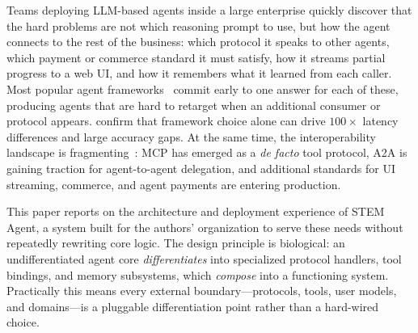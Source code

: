 \documentclass[11pt]{article}
\begin{document}
Teams deploying LLM-based agents inside a large enterprise quickly discover that the hard problems are not which reasoning prompt to use, but how the agent connects to the rest of the business: which protocol it speaks to other agents, which payment or commerce standard it must satisfy, how it streams partial progress to a web UI, and how it remembers what it learned from each caller. Most popular agent frameworks~\citep{tran2025multiagent, ferrag2025agents} commit early to one answer for each of these, producing agents that are hard to retarget when an additional consumer or protocol appears. \citet{orogat2026mafbench} confirm that framework choice alone can drive $100\times$ latency differences and large accuracy gaps. At the same time, the interoperability landscape is fragmenting~\citep{ehtesham2025survey, li2025gluetoprotocols}: MCP has emerged as a \emph{de facto} tool protocol, A2A is gaining traction for agent-to-agent delegation, and additional standards for UI streaming, commerce, and agent payments are entering production.

This paper reports on the architecture and deployment experience of STEM Agent, a system built for the authors' organization to serve these needs without repeatedly rewriting core logic. The design principle is biological: an undifferentiated agent core \emph{differentiates} into specialized protocol handlers, tool bindings, and memory subsystems, which \emph{compose} into a functioning system. Practically this means every external boundary---protocols, tools, user models, and domains---is a pluggable differentiation point rather than a hard-wired choice.
\end{document}
